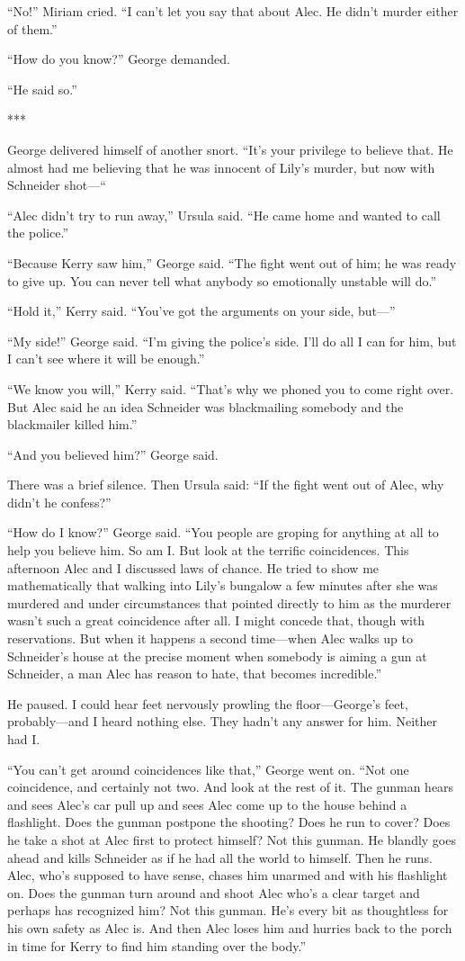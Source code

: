 {“No!” Miriam cried. “I can’t let you say that about Alec. He didn’t murder either of them.”

“How do you know?” George demanded.

“He said so.”

***

George delivered himself of another snort. “It’s your privilege to believe that. He almost had me believing that he was innocent of Lily’s murder, but now with Schneider shot—“

“Alec didn’t try to run away,” Ursula said. “He came home and wanted to call the police.”

“Because Kerry saw him,” George said. “The fight went out of him; he was ready to give up. You can never tell what anybody so emotionally unstable will do.”

“Hold it,” Kerry said. “You’ve got the arguments on your side, but—”

“My side!” George said. “I’m giving the police’s side. I’ll do all I can for him, but I can’t see where it will be enough.”

“We know you will,” Kerry said. “That’s why we phoned you to come right over. But Alec said he an idea Schneider was blackmailing somebody and the blackmailer killed him.”

“And you believed him?” George said.

There was a brief silence. Then Ursula said: “If the fight went out of Alec, why didn’t he confess?”

“How do I know?” George said. “You people are groping for anything at all to help you believe him. So am I. But look at the terrific coincidences. This afternoon Alec and I discussed laws of chance. He tried to show me mathematically that walking into Lily’s bungalow a few minutes after she was murdered and under circumstances that pointed directly to him as the murderer wasn’t such a great coincidence after all. I might concede that, though with reservations. But when it happens a second time—when Alec walks up to Schneider’s house at the precise moment when somebody is aiming a gun at Schneider, a man Alec has reason to hate, that becomes incredible.”

He paused. I could hear feet nervously prowling the floor—George’s feet, probably—and I heard nothing else. They hadn’t any answer for him. Neither had I.

“You can’t get around coincidences like that,” George went on. “Not one coincidence, and certainly not two. And look at the rest of it. The gunman hears and sees Alec’s car pull up and sees Alec come up to the house behind a flashlight. Does the gunman postpone the shooting? Does he run to cover? Does he take a shot at Alec first to protect himself? Not this gunman. He blandly goes ahead and kills Schneider as if he had all the world to himself. Then he runs. Alec, who’s supposed to have sense, chases him unarmed and with his flashlight on. Does the gunman turn around and shoot Alec who’s a clear target and perhaps has recognized him? Not this gunman. He’s every bit as thoughtless for his own safety as Alec is. And then Alec loses him and hurries back to the porch in time for Kerry to find him standing over the body.”

}
